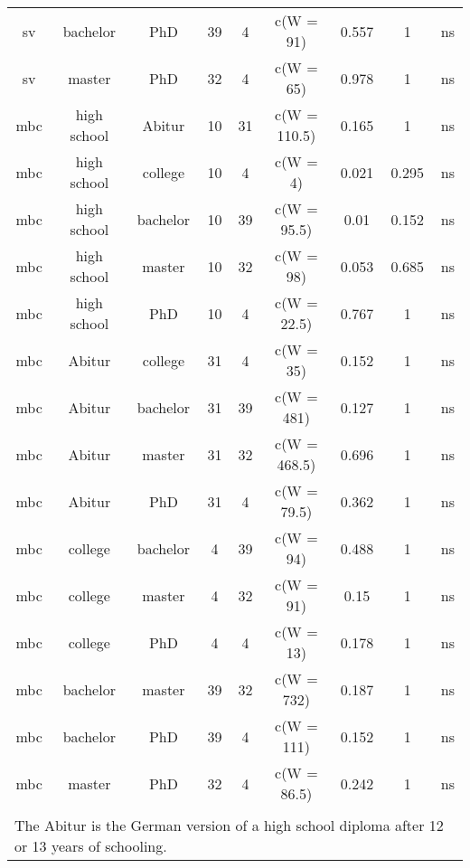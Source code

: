 \begin{table}[!htbp]
\begin{tabular}{@{\extracolsep{5pt}} ccccccccc}
sv & bachelor & PhD & 39 & 4 & c(W = 91) & 0.557 & 1 & ns \\ 
sv & master & PhD & 32 & 4 & c(W = 65) & 0.978 & 1 & ns \\ 
mbc & high school & Abitur & 10 & 31 & c(W = 110.5) & 0.165 & 1 & ns \\ 
mbc & high school & college & 10 & 4 & c(W = 4) & 0.021 & 0.295 & ns \\ 
mbc & high school & bachelor & 10 & 39 & c(W = 95.5) & 0.01 & 0.152 & ns \\ 
mbc & high school & master & 10 & 32 & c(W = 98) & 0.053 & 0.685 & ns \\ 
mbc & high school & PhD & 10 & 4 & c(W = 22.5) & 0.767 & 1 & ns \\ 
mbc & Abitur & college & 31 & 4 & c(W = 35) & 0.152 & 1 & ns \\ 
mbc & Abitur & bachelor & 31 & 39 & c(W = 481) & 0.127 & 1 & ns \\ 
mbc & Abitur & master & 31 & 32 & c(W = 468.5) & 0.696 & 1 & ns \\ 
mbc & Abitur & PhD & 31 & 4 & c(W = 79.5) & 0.362 & 1 & ns \\ 
mbc & college & bachelor & 4 & 39 & c(W = 94) & 0.488 & 1 & ns \\ 
mbc & college & master & 4 & 32 & c(W = 91) & 0.15 & 1 & ns \\ 
mbc & college & PhD & 4 & 4 & c(W = 13) & 0.178 & 1 & ns \\ 
mbc & bachelor & master & 39 & 32 & c(W = 732) & 0.187 & 1 & ns \\ 
mbc & bachelor & PhD & 39 & 4 & c(W = 111) & 0.152 & 1 & ns \\ 
mbc & master & PhD & 32 & 4 & c(W = 86.5) & 0.242 & 1 & ns \\ 
\hline \\[-1.8ex] 
\multicolumn{9}{l}{The Abitur is the German version of a high school diploma after 12 or 13 years of schooling.} \\ 
\end{tabular} 
\end{table} 
